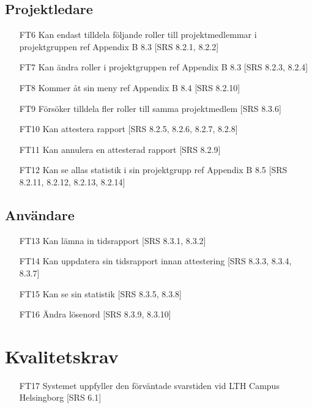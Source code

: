 \documentclass[paper=a4, fontsize=11pt,twoside]{article}
\begin{document}
\subsection{Projektledare}  
\begin{itemize}
\item[FT6] Kan endast tilldela följande roller till projektmedlemmar i
projektgruppen ref Appendix B 8.3 [SRS 8.2.1, 8.2.2]
\item[FT7] Kan ändra roller i projektgruppen ref Appendix B 8.3 [SRS 8.2.3,
8.2.4]
\item[FT8] Kommer åt sin meny ref Appendix B 8.4 [SRS 8.2.10] 
\item[FT9] Försöker tilldela fler roller till samma projektmedlem [SRS 8.3.6] 
\item[FT10] Kan attestera rapport [SRS 8.2.5, 8.2.6, 8.2.7, 8.2.8] 
\item[FT11] Kan annulera en attesterad rapport [SRS 8.2.9] 
\item[FT12] Kan se allas statistik i sin projektgrupp ref Appendix B 8.5 [SRS
8.2.11, 8.2.12, 8.2.13, 8.2.14]
\end{itemize}


\subsection{Användare} 
\begin{itemize}
\item[FT13] Kan lämna in tidsrapport [SRS 8.3.1, 8.3.2] 
\item[FT14] Kan uppdatera sin tidsrapport innan attestering [SRS 8.3.3,
8.3.4, 8.3.7]
\item[FT15] Kan se sin statistik [SRS 8.3.5, 8.3.8] 
\item[FT16] Ändra lösenord [SRS 8.3.9, 8.3.10] 
\end{itemize}

\section{Kvalitetskrav} 
\begin{itemize}
\item[FT17] Systemet uppfyller den förväntade svarstiden vid LTH Campus Helsingborg
[SRS 6.1]
\end{itemize}
\end{document}
